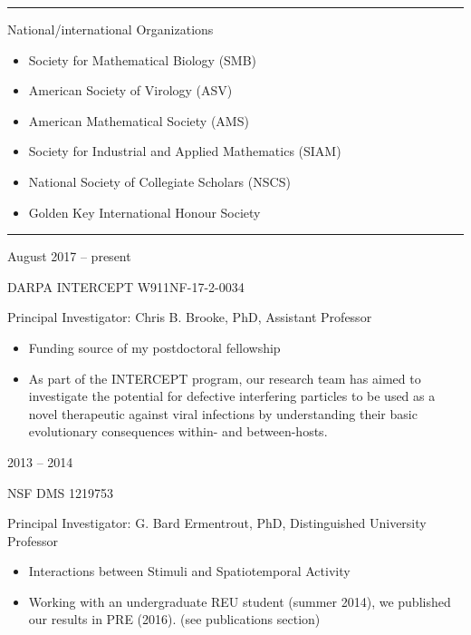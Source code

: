 \documentclass[a4paper,10pt]{article}
\newlength{\cvcolumngapwidth}
\newlength{\cvleftcolumnwidth}
\newlength{\cvrightcolumnwidth}
\newcommand{\cvsectionstyle}[1]{{\normalsize\cvsectionfont\textcolor{cvsectioncolor}{#1}}}
\newcommand{\cvtitlestyle}[1]{{\large\cvtitlefont\textcolor{cvtitlecolor}{#1}}}
\newcommand{\cvheadingstyle}[1]{{\normalsize\cvheadingfont\textcolor{cvheadingcolor}{#1}}}
\newlength{\cvafteritemskipamount}
\newlength{\cvaftersectionskipamount}
\newlength{\cvbetweensectionandheadingextraskipamount}
\newlength{\cvaftertitleskipamount}
\newlength{\cvparskip}
\newcommand{\cvsection}[1]{
    \begin{minipage}[t]{\cvleftcolumnwidth}
        \raggedleft\cvsectionstyle{#1}
    \end{minipage}%
    \hspace{\cvcolumngapwidth}%
    \begin{minipage}[t]{\cvrightcolumnwidth}
        \textcolor{cvrulecolor}{\rule{\cvrightcolumnwidth}{0.3mm}}
    \end{minipage}

    \vspace{\cvaftersectionskipamount}
}
\newcommand{\cvitem}[2]{
    \begin{minipage}[t]{\cvleftcolumnwidth}
        \raggedleft #1
    \end{minipage}%
    \hspace{\cvcolumngapwidth}%
    \begin{minipage}[t]{\cvrightcolumnwidth}
        \setlength{\parskip}{\cvparskip} #2
    \end{minipage}

    \vspace{\cvafteritemskipamount}
}
\newcommand{\cvtitle}[1]{
    \cvtitlestyle{#1}

    \vspace{\cvaftertitleskipamount}
    \vspace{-\cvparskip}
}
\begin{document}
\newpage
\cvsection{PROFESSIONAL MEMBERSHIPS \& AFFILIATIONS}

\cvitem{
    \cvheadingstyle{}
}{
    \cvtitle{National/international Organizations}
    \begin{itemize}[leftmargin=*]
    	\item Society for Mathematical Biology (SMB)
        \item American Society of Virology (ASV)
        \item American Mathematical Society (AMS)
        \item Society for Industrial and Applied Mathematics (SIAM)
        \item National Society of Collegiate Scholars (NSCS)
        \item Golden Key International Honour Society
    \end{itemize}
    
}


%
%


\cvsection{FUNDING ACKNOWLEDGMENTS}
\vspace{\cvbetweensectionandheadingextraskipamount}

\cvitem{
    \cvheadingstyle{August 2017 -- present}
}{
    \cvtitle{DARPA INTERCEPT W911NF-17-2-0034} 
    Principal Investigator: Chris B. Brooke, PhD, Assistant Professor
    \begin{itemize}
	\item Funding source of my postdoctoral fellowship
    	\item As part of the INTERCEPT program, our research team has aimed to investigate the potential for defective interfering particles to be used as a novel therapeutic against viral infections by understanding their basic evolutionary consequences within- and between-hosts.
    \end{itemize}
    
}

\cvitem{
    \cvheadingstyle{2013 -- 2014}
}{
    \cvtitle{NSF DMS 1219753} 
    Principal Investigator: G. Bard Ermentrout, PhD, Distinguished University Professor
    \begin{itemize}
        \item Interactions between Stimuli and Spatiotemporal Activity
        \item Working with an undergraduate REU student (summer 2014), we published our results in PRE (2016). (see publications section) \\
    \end{itemize}
    
}
\end{document}
